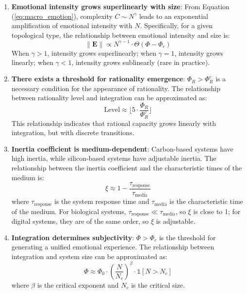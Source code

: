 \documentclass[12pt,a4paper]{article}
\theoremstyle{plain}
\newcommand{\ve}[1]{\bm{#1}}                    %
\newcommand{\Evec}{\ve{E}}                        %
\newcommand{\ind}{\mathds{1}}
\begin{document}
\begin{enumerate}
    \item \textbf{Emotional intensity grows superlinearly with size}: From Equation (\ref{eq:macro_emotion}), complexity $C \sim N^\gamma$ leads to an exponential amplification of emotional intensity with $N$. Specifically, for a given topological type, the relationship between emotional intensity and size is:
    \begin{equation}
    \|\Evec\| \propto N^{\gamma-1} \cdot \Theta(\Phi - \Phi_c)
    \label{eq:scaling_law}
    \end{equation}
    When $\gamma > 1$, intensity grows superlinearly; when $\gamma = 1$, intensity grows linearly; when $\gamma < 1$, intensity grows sublinearly (rare in practice).
    
    \item \textbf{There exists a threshold for rationality emergence}: $\Phi_R > \Phi_R^c$ is a necessary condition for the appearance of rationality. The relationship between rationality level and integration can be approximated as:
    \begin{equation}
    \text{Level} \approx \lfloor 5 \cdot \frac{\Phi_R}{\Phi_R^c} \rfloor
    \label{eq:rational_level}
    \end{equation}
    This relationship indicates that rational capacity grows linearly with integration, but with discrete transitions.
    
    \item \textbf{Inertia coefficient is medium-dependent}: Carbon-based systems have high inertia, while silicon-based systems have adjustable inertia. The relationship between the inertia coefficient and the characteristic times of the medium is:
    \begin{equation}
    \xi \approx 1 - \frac{\tau_{\text{response}}}{\tau_{\text{media}}}
    \label{eq:xi_media}
    \end{equation}
    where $\tau_{\text{response}}$ is the system response time and $\tau_{\text{media}}$ is the characteristic time of the medium. For biological systems, $\tau_{\text{response}} \ll \tau_{\text{media}}$, so $\xi$ is close to 1; for digital systems, they are of the same order, so $\xi$ is adjustable.
    
    \item \textbf{Integration determines subjectivity}: $\Phi > \Phi_c$ is the threshold for generating a unified emotional experience. The relationship between integration and system size can be approximated as:
    \begin{equation}
   \Phi \approx \Phi_0 \cdot \left( \frac{N}{N_c} \right)^{\beta} \cdot \ind[N > N_c]
    \label{eq:phi_scaling}
    \end{equation}
    where $\beta$ is the critical exponent and $N_c$ is the critical size.
\end{enumerate}
\end{document}
